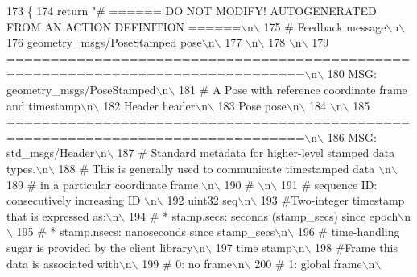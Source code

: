 \begin{DoxyCode}
173   \{
174     \textcolor{keywordflow}{return} \textcolor{stringliteral}{"# ====== DO NOT MODIFY! AUTOGENERATED FROM AN ACTION DEFINITION ======\(\backslash\)n\(\backslash\)}
175 \textcolor{stringliteral}{# Feedback message\(\backslash\)n\(\backslash\)}
176 \textcolor{stringliteral}{geometry\_msgs/PoseStamped pose\(\backslash\)n\(\backslash\)}
177 \textcolor{stringliteral}{\(\backslash\)n\(\backslash\)}
178 \textcolor{stringliteral}{\(\backslash\)n\(\backslash\)}
179 \textcolor{stringliteral}{================================================================================\(\backslash\)n\(\backslash\)}
180 \textcolor{stringliteral}{MSG: geometry\_msgs/PoseStamped\(\backslash\)n\(\backslash\)}
181 \textcolor{stringliteral}{# A Pose with reference coordinate frame and timestamp\(\backslash\)n\(\backslash\)}
182 \textcolor{stringliteral}{Header header\(\backslash\)n\(\backslash\)}
183 \textcolor{stringliteral}{Pose pose\(\backslash\)n\(\backslash\)}
184 \textcolor{stringliteral}{\(\backslash\)n\(\backslash\)}
185 \textcolor{stringliteral}{================================================================================\(\backslash\)n\(\backslash\)}
186 \textcolor{stringliteral}{MSG: std\_msgs/Header\(\backslash\)n\(\backslash\)}
187 \textcolor{stringliteral}{# Standard metadata for higher-level stamped data types.\(\backslash\)n\(\backslash\)}
188 \textcolor{stringliteral}{# This is generally used to communicate timestamped data \(\backslash\)n\(\backslash\)}
189 \textcolor{stringliteral}{# in a particular coordinate frame.\(\backslash\)n\(\backslash\)}
190 \textcolor{stringliteral}{# \(\backslash\)n\(\backslash\)}
191 \textcolor{stringliteral}{# sequence ID: consecutively increasing ID \(\backslash\)n\(\backslash\)}
192 \textcolor{stringliteral}{uint32 seq\(\backslash\)n\(\backslash\)}
193 \textcolor{stringliteral}{#Two-integer timestamp that is expressed as:\(\backslash\)n\(\backslash\)}
194 \textcolor{stringliteral}{# * stamp.secs: seconds (stamp\_secs) since epoch\(\backslash\)n\(\backslash\)}
195 \textcolor{stringliteral}{# * stamp.nsecs: nanoseconds since stamp\_secs\(\backslash\)n\(\backslash\)}
196 \textcolor{stringliteral}{# time-handling sugar is provided by the client library\(\backslash\)n\(\backslash\)}
197 \textcolor{stringliteral}{time stamp\(\backslash\)n\(\backslash\)}
198 \textcolor{stringliteral}{#Frame this data is associated with\(\backslash\)n\(\backslash\)}
199 \textcolor{stringliteral}{# 0: no frame\(\backslash\)n\(\backslash\)}
200 \textcolor{stringliteral}{# 1: global frame\(\backslash\)n\(\backslash\)}

\end{DoxyCode}
